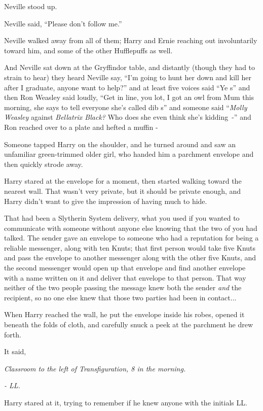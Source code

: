 Neville stood up.

Neville said, ``Please don't follow me.''

Neville walked away from all of them; Harry and Ernie reaching out involuntarily toward him, and some of the other Hufflepuffs as well.

And Neville sat down at the Gryffindor table, and distantly (though they had to strain to hear) they heard Neville say, ``I'm going to hunt her down and kill her after I graduate, anyone want to help?'' and at least five voices said ``Ye s'' and then Ron Weasley said loudly, ``Get in line, you lot, I got an owl from Mum this morning, she says to tell everyone she's called dib s'' and someone said ``\emph{Molly Weasley} against \emph{Bellatrix Black?} Who does she even think she's kidding~-'' and Ron reached over to a plate and hefted a muffin -

Someone tapped Harry on the shoulder, and he turned around and saw an unfamiliar green-trimmed older girl, who handed him a parchment envelope and then quickly strode away.

Harry stared at the envelope for a moment, then started walking toward the nearest wall. That wasn't very private, but it should be private enough, and Harry didn't want to give the impression of having much to hide.

That had been a Slytherin System delivery, what you used if you wanted to communicate with someone without anyone else knowing that the two of you had talked. The sender gave an envelope to someone who had a reputation for being a reliable messenger, along with ten Knuts; that first person would take five Knuts and pass the envelope to another messenger along with the other five Knuts, and the second messenger would open up that envelope and find another envelope with a name written on it and deliver that envelope to that person. That way neither of the two people passing the message knew both the sender \emph{and} the recipient, so no one else knew that those two parties had been in contact...

When Harry reached the wall, he put the envelope inside his robes, opened it beneath the folds of cloth, and carefully snuck a peek at the parchment he drew forth.

It said,

\emph{Classroom to the left of Transfiguration, 8 in the morning.}

\emph{- LL.}

Harry stared at it, trying to remember if he knew anyone with the initials LL.

